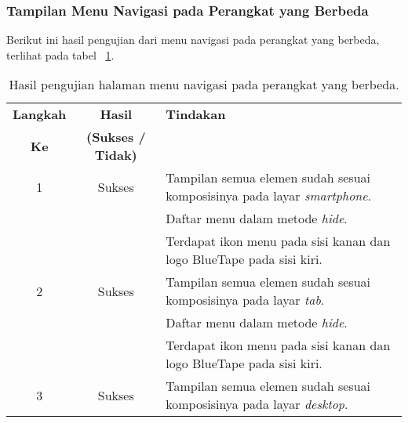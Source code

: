 \subsubsection{Tampilan Menu Navigasi pada Perangkat yang Berbeda}
Berikut ini hasil pengujian dari menu navigasi pada perangkat yang berbeda, terlihat pada tabel ~\ref{hasil:MenuNavigasiDevices}.
\begin{table}[H]
	\centering 
	\caption{Hasil pengujian halaman menu navigasi pada perangkat yang berbeda.}
	\label{hasil:MenuNavigasiDevices}
	\begin{tabular}{|c|c|p{}|}
		\toprule
		\textbf{Langkah} & \textbf{Hasil} & \textbf{Tindakan}\\
		\textbf{Ke} & \textbf{(Sukses / Tidak)} & \\		
		\midrule
		1 & Sukses & Tampilan semua elemen sudah sesuai komposisinya pada layar \textit{smartphone}.\\
		&& Daftar menu dalam metode \textit{hide}.\\
		&& Terdapat ikon menu pada sisi kanan dan logo BlueTape pada sisi kiri.\\
		\hline
		\hline
		2 & Sukses & Tampilan semua elemen sudah sesuai komposisinya pada layar \textit{tab}.\\
		&& Daftar menu dalam metode \textit{hide}.\\
		&& Terdapat ikon menu pada sisi kanan dan logo BlueTape pada sisi kiri.\\
		\hline
		3 & Sukses & Tampilan semua elemen sudah sesuai komposisinya pada layar \textit{desktop}.\\
		\hline
		\bottomrule		
	\end{tabular} 
\end{table}

